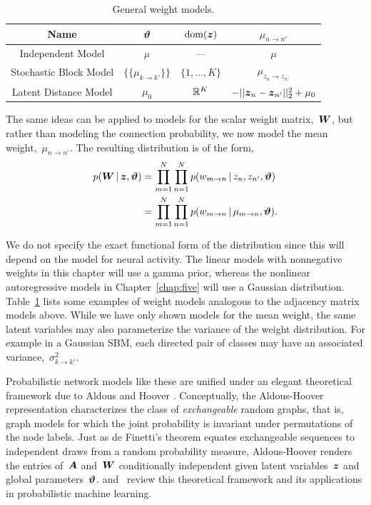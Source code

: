 \begin{table}
\begin{center}
\begin{tabular}{c|c|c|c}
Name & $\boldsymbol{\vartheta}$ & $\mathrm{dom}(\boldsymbol{z})$ & $\mu_{n \to n'}$ \\
\hline
Independent Model & $\mu$ & --- & $\mu$ \\
Stochastic Block Model & $\{\{ \mu_{k \to k'} \}\}$ & $\{1, \ldots, K\}$ & $\mu_{z_n \to z_{n'}}$ \\
Latent Distance Model & $\mu_0$ & $\mathbb{R}^K$ & $-||\boldsymbol{z}_n - \boldsymbol{z}_{n'}||_2^2 + \mu_0$ 
\end{tabular}
\end{center}
\caption{General weight models.}
\label{tab:W_models}
\end{table}

The same ideas can be applied to models for the scalar weight matrix,~$\boldsymbol{W}$,
but rather than modeling the connection probability, we now model the
mean weight,~$\mu_{n \to n'}$. The resulting distribution is of the form,
\begin{align*}
  p(\boldsymbol{W} \,|\, \boldsymbol{z}, \boldsymbol{\vartheta})
  &= \prod_{m=1}^N \prod_{n=1}^N p(w_{m \to n} \,|\, z_n, z_{n'}, \boldsymbol{\vartheta}) \\
  &= \prod_{m=1}^N \prod_{n=1}^N p(w_{m \to n} \,|\, \mu_{m \to n}, \boldsymbol{\vartheta}).
\end{align*}

We do not specify the exact functional form of the distribution since
this will depend on the model for neural activity. The linear
models with nonnegative weights in this chapter will use a gamma
prior, whereas the nonlinear autoregressive models in Chapter~\ref{chap:five} will use a Gaussian
distribution. Table~\ref{tab:W_models} lists some examples of weight
models analogous to the adjacency matrix models above.
While we have only shown models for the mean weight,
the same latent variables may
also parameterize the variance of the weight distribution. For example
in a Gaussian SBM, each directed pair of classes may have an
associated variance,~$\sigma^2_{k \to k'}$.

Probabilistic network models like these are unified under an elegant
theoretical framework due to Aldous and Hoover
\citep{Aldous-1981,Hoover-1979}. Conceptually, the Aldous-Hoover
representation characterizes the class of \textit{exchangeable} random
graphs, that is, graph models for which the joint probability is
invariant under permutations of the node labels. Just as de Finetti's
theorem equates exchangeable sequences to independent draws from a
random probability measure, Aldous-Hoover renders the entries of~$\boldsymbol{A}$ and~$\boldsymbol{W}$ conditionally
independent given latent variables~$\boldsymbol{z}$ and global
parameters~$\boldsymbol{\vartheta}$. \citet{Lloyd-2012} and~\citet{orbanz2015bayesian}
review this theoretical framework and its applications in
probabilistic machine learning.

